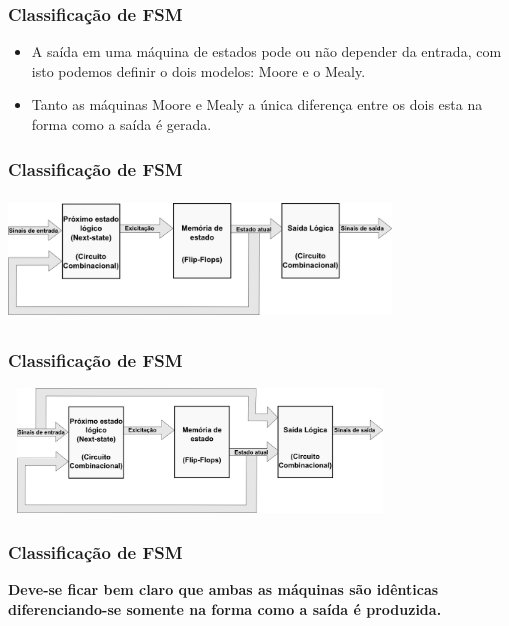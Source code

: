 \documentclass{beamer}
\begin{document}
\begin{frame}
  \frametitle{Classificação de FSM}
  \begin{itemize}
    \item A saída em uma máquina de estados pode ou não depender da entrada, com isto podemos definir o dois modelos: Moore e o Mealy.\pause
    \item Tanto as máquinas Moore e Mealy a única diferença entre os dois esta na forma como a saída é gerada.
  \end{itemize}
\end{frame}

\begin{frame}
  \frametitle{Classificação de FSM}
    \includegraphics[height = 1.3in, width = 4in]{modelo_7.png}
\end{frame}

\begin{frame}
  \frametitle{Classificação de FSM}
    \includegraphics[height = 1.3in, width = 4in]{modelo_8.png}
\end{frame}

\begin{frame}
  \frametitle{Classificação de FSM}
  \textbf{Deve-se ficar bem claro que ambas as máquinas são idênticas diferenciando-se somente na forma como a saída é produzida.}
\end{frame}
\end{document}
